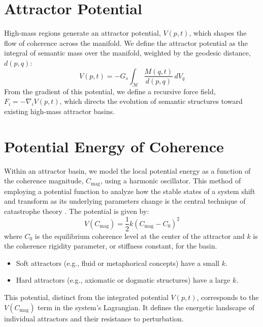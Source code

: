 \section{Attractor Potential}

High-mass regions generate an attractor potential, \(V(p,t)\), which shapes the flow of coherence across the manifold. We define the attractor potential as the integral of semantic mass over the manifold, weighted by the geodesic distance, \(d(p, q)\):
\begin{equation}
V(p, t) = -G_s \int_{\mathcal{M}} \frac{M(q, t)}{d(p, q)} \, dV_q
\end{equation}
From the gradient of this potential, we define a recursive force field, \(F_i = -\nabla_i V(p,t)\), which directs the evolution of semantic structures toward existing high-mass attractor basins.

\section{Potential Energy of Coherence}

Within an attractor basin, we model the local potential energy as a function of the coherence magnitude, \(C_{\text{mag}}\), using a harmonic oscillator. This method of employing a potential function to analyze how the stable states of a system shift and transform as its underlying parameters change is the central technique of catastrophe theory \autocite{Thom1975}. The potential is given by:
\begin{equation}
V(C_{\text{mag}}) = \frac{1}{2}k(C_{\text{mag}} - C_0)^2
\end{equation}
where \(C_0\) is the equilibrium coherence level at the center of the attractor and \(k\) is the coherence rigidity parameter, or stiffness constant, for the basin.
\begin{itemize}
    \item Soft attractors (e.g., fluid or metaphorical concepts) have a small \(k\).
    \item Hard attractors (e.g., axiomatic or dogmatic structures) have a large \(k\).
\end{itemize}
This potential, distinct from the integrated potential \(V(p,t)\), corresponds to the \(V(C_{\text{mag}})\) term in the system's Lagrangian. It defines the energetic landscape of individual attractors and their resistance to perturbation. 